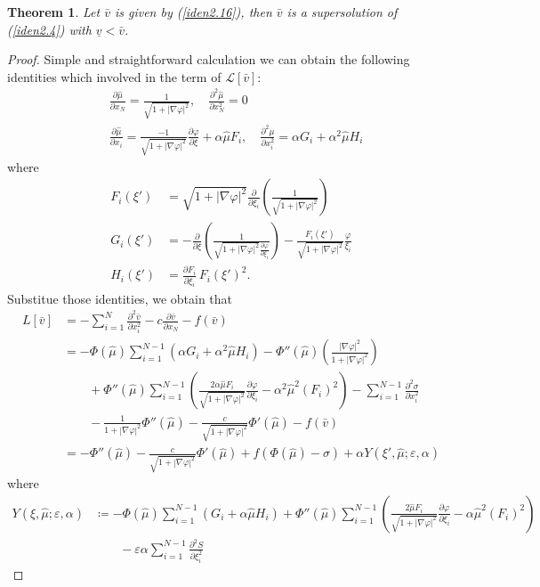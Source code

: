 \documentclass[12pt, a4paper]{article}
\newtheorem{thm}{Theorem}[section]
\numberwithin{equation}{section}
\renewcommand{\L}{\mathcal{L}}
\newcommand{\hmu}{\hat{\mu}}
\newcommand{\pd}[2]{\frac{\partial #1}{\partial #2}}
\newcommand{\pdd}[2]{\frac{\partial^2 #1}{\partial #2^2}}
\begin{document}
\begin{CJK}{UTF8}{bkai}
\begin{thm}
	Let $\bar{v}$ is given by (\ref{iden2.16}), then $\bar{v}$ is a supersolution of (\ref{iden2.4}) with $\underline{v}<\bar{v}$.
\end{thm}
\begin{proof}
	Simple and straightforward calculation we can obtain the following identities which involved in the term of $\L[\bar{v}]$:
\begin{align*}
	&\pd{\hmu}{x_N}=\frac{1}{\sqrt{1+|\nabla\varphi|^2}},\quad\pdd{\hmu}{x_N}=0\\
	&\pd{\hmu}{x_i}=\frac{-1}{\sqrt{1+|\nabla\varphi|^2}}\pd{\varphi}{\xi}+\alpha\hmu F_i,\quad\pdd{\mu}{x_i}=\alpha G_i+\alpha^2\hmu H_i
\end{align*}
where
\begin{align}
	F_i(\xi')&=\sqrt{1+|\nabla\varphi|^2}\pd{}{\xi_i}\left(\frac{1}{\sqrt{1+|\nabla\varphi|^2}}\right)\\
	G_i(\xi')&=-\pd{}{\xi}\left(\frac{1}{\sqrt{1+|\nabla\varphi|^2}\pd{\varphi}{\xi_i}}\right)-\frac{F_i(\xi')}{\sqrt{1+|\nabla\varphi|^2}}\frac{\varphi}{\xi_i}\\
	H_i(\xi')&=\pd{F_i}{\xi_i}\,F_i(\xi')^2.
\end{align}
Substitue those identities, we obtain that
\begin{align*}
	L[\bar{v}]&=-\sum_{i=1}^N\pdd{\bar{v}}{x_i}-c\pd{\bar{v}}{x_N}-f(\bar{v})\\
		&=-\Phi(\hmu)\sum_{i=1}^{N-1}(\alpha G_i+\alpha^2\hmu H_i)-\Phi''(\hmu)\left(\frac{|\nabla\varphi|^2}{1+|\nabla\varphi|^2}\right)\\
		&\quad\quad+\Phi''(\hmu)\sum_{i=1}^{N-1}\left(\frac{2\alpha\hmu F_i}{\sqrt{1+|\nabla\varphi|^2}}\pd{\varphi}{\xi_i}-\alpha^2\hmu^2(F_i)^2\right)-\sum_{i=1}^{N-1}\pdd{\sigma}{x_i}\\
		&\quad\quad -\frac{1}{1+|\nabla\varphi|^2}\Phi''(\hmu)-\frac{c}{\sqrt{1+|\nabla\varphi|^2}}\Phi'(\hmu)-f(\bar{v})\\
		&=-\Phi''(\hmu)-\frac{c}{\sqrt{1+|\nabla\varphi|^2}}\Phi'(\hmu)+f(\Phi(\hmu)-\sigma)+\alpha Y(\xi',\hmu;\varepsilon,\alpha)
\end{align*}
where
\begin{align*}
	Y(\xi,\hmu;\varepsilon,\alpha)&\coloneqq -\Phi(\hmu)\sum_{i=1}^{N-1}( G_i+\alpha\hmu H_i)+\Phi''(\hmu)\sum_{i=1}^{N-1}\left(\frac{2\hmu F_i}{\sqrt{1+|\nabla\varphi|^2}}\pd{\varphi}{\xi_i}-\alpha\hmu^2(F_i)^2\right)\\
		&\quad\quad-\varepsilon\alpha\sum_{i=1}^{N-1}\pdd{S}{\xi_i}
\end{align*}



\end{proof}
\end{CJK}
\end{document}
